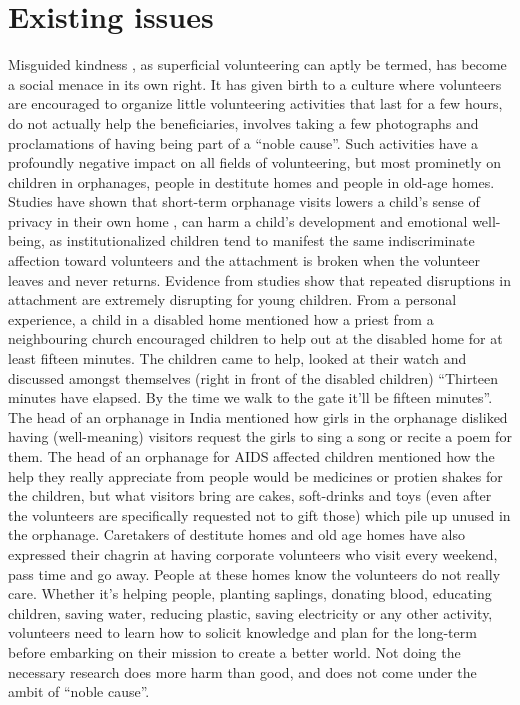 \documentclass[conference]{IEEEtran}
\begin{document}
\section{Existing issues}
Misguided kindness \cite{misguidedKindness}, as superficial volunteering can aptly be termed, has become a social menace in its own right. It has given birth to a culture where volunteers are encouraged to organize little volunteering activities that last for a few hours, do not actually help the beneficiaries, involves taking a few photographs and proclamations of having being part of a \enquote{noble cause}. Such activities have a profoundly negative impact on all fields of volunteering, but most prominetly on children in orphanages, people in destitute homes and people in old-age homes. Studies have shown \cite{orphanageVisits2} that short-term orphanage visits lowers a child's sense of privacy in their own home \cite{guidelinesOnAlternativeCare}, can harm a child's development and emotional well-being, as institutionalized children tend to manifest the same indiscriminate affection toward volunteers and the attachment is broken when the volunteer leaves and never returns. Evidence from studies show that repeated disruptions in attachment are extremely disrupting for young children. From a personal experience, a child in a disabled home mentioned how a priest from a neighbouring church encouraged children to help out at the disabled home for at least fifteen minutes. The children came to help, looked at their watch and discussed amongst themselves (right in front of the disabled children) \enquote{Thirteen minutes have elapsed. By the time we walk to the gate it'll be fifteen minutes}. The head of an orphanage in India mentioned how girls in the orphanage disliked having (well-meaning) visitors request the girls to sing a song or recite a poem for them. The head of an orphanage for AIDS affected children mentioned how the help they really appreciate from people would be medicines or protien shakes for the children, but what visitors bring are cakes, soft-drinks and toys (even after the volunteers are specifically requested not to gift those) which pile up unused in the orphanage. Caretakers of destitute homes and old age homes have also expressed their chagrin at having corporate volunteers who visit every weekend, pass time and go away. People at these homes know the volunteers do not really care.
Whether it's helping people, planting saplings, donating blood, educating children, saving water, reducing plastic, saving electricity or any other activity, volunteers need to learn how to solicit knowledge and plan for the long-term before embarking on their mission to create a better world. Not doing the necessary research does more harm than good, and does not come under the ambit of \enquote{noble cause}.
\end{document}
